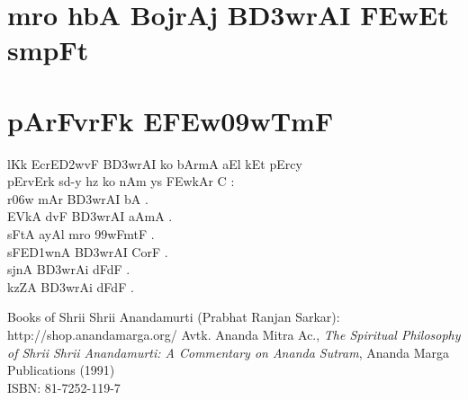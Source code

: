 \documentclass[12pt]{book}
\begin{document}
\frontmatter
%
\chapter*{\large {} }
\thispagestyle{empty}
\section*{\huge {}}
\newpage
%
\chapter*{\center \normalsize  {\dn m\?ro h\0bA BojrAj B\3D3wrAI \3FEwEt smpF{\qvb}t}}
%
%
\mainmatter
%
\chapter{ {\dn pArFvrFk E\3FEw\309wTmF}}
 {\dn l\?Kk EcrE\3D2wvF B\3D3wrAI ko bAr\?mA aEl kEt pErcy\\
pErvErk sd-y hz ko nAm ys \3FEwkAr C {\rs :\re} \\
r\?\306w mAr B\3D3wrAI bA .\\
EVkA d\?vF B\3D3wrAI aAmA . \\
sFtA ayA\0l m\?ro \399wFmtF . \\
sFE\3D1wnA B\3D3wrAI CorF . \\
sjnA B\3D3wrAi dFdF . \\
kzZA B\3D3wrAi dFdF . \\
}
%
\backmatter
%
\begin{thebibliography}{99}
Books of Shrii Shrii Anandamurti (Prabhat Ranjan Sarkar): \\
http://shop.anandamarga.org/
Avtk. Ananda Mitra Ac., \emph{The Spiritual Philosophy of Shrii Shrii Anandamurti: A Commentary on Ananda Sutram}, Ananda Marga Publications (1991) \\
ISBN: 81-7252-119-7
\end{thebibliography}
\end{document}
